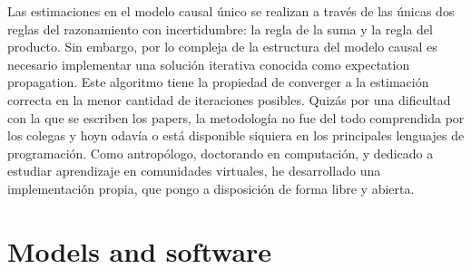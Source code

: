\documentclass[article]{jss}
\begin{document}

Las estimaciones en el modelo causal único se realizan a través de las únicas dos reglas del razonamiento con incertidumbre: la regla de la suma y la regla del producto.
%
Sin embargo, por lo compleja de la estructura del modelo causal es necesario implementar una solución iterativa conocida como expectation propagation.
%
Este algoritmo tiene la propiedad de converger a la estimación
correcta en la menor cantidad de iteraciones posibles.
%
Quizás por una dificultad con la que se escriben los papers, la metodología no fue del todo comprendida por los colegas y hoyn odavía o está disponible siquiera en los principales lenguajes de programación.
%
Como antropólogo, doctorando en computación, y dedicado a estudiar aprendizaje en comunidades virtuales, he desarrollado una implementación propia, que pongo a disposición de forma libre y abierta.






% 
% 
% 
% 
% 
% 
% 
% 



















\section{Models and software} \label{sec:computoAnilitico}
\end{document}
